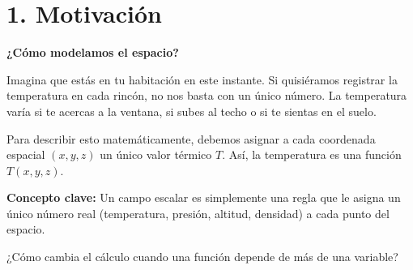 \documentclass[11pt]{article}
\newenvironment{motivacion}{%
  \section*{1. Motivación}%
}{}
\newenvironment{preguntaguia}{%
  \begin{tcolorbox}[colback=cyan!5,colframe=cyan!75!black,title=Pregunta Guía]%
}{%
  \end{tcolorbox}%
}
\begin{document}
\begin{motivacion}
  \textbf{¿Cómo modelamos el espacio?}
  
  Imagina que estás en tu habitación en este instante. Si quisiéramos registrar la temperatura en cada rincón, no nos basta con un único número. La temperatura varía si te acercas a la ventana, si subes al techo o si te sientas en el suelo.
  
  Para describir esto matemáticamente, debemos asignar a cada coordenada espacial $(x, y, z)$ un único valor térmico $T$. Así, la temperatura es una función $T(x,y,z)$. 
  
  \textbf{Concepto clave:} Un campo escalar es simplemente una regla que le asigna un único número real (temperatura, presión, altitud, densidad) a cada punto del espacio.

  \begin{preguntaguia}
    ¿Cómo cambia el cálculo cuando una función depende de más de una variable?
  \end{preguntaguia}
\end{motivacion}
\end{document}
